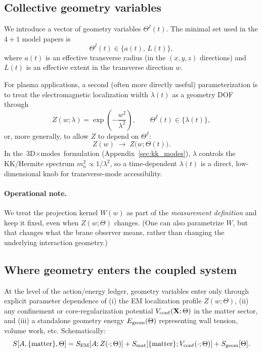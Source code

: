 \documentclass[11pt]{article}
\begin{document}
\subsection{Collective geometry variables}
\label{app:geom_vars}

We introduce a vector of geometry variables \(\Theta^I(t)\). The minimal set used in the
\(4+1\) model papers is
\begin{equation}
\Theta^I(t) \in \{a(t),\,L(t)\},
\end{equation}
where \(a(t)\) is an effective transverse radius (in the \((x,y,z)\) directions) and
\(L(t)\) is an effective extent in the transverse direction \(w\).

For plasma applications, a second (often more directly useful) parameterization is to
treat the electromagnetic localization width \(\lambda(t)\) as a geometry DOF through
\begin{equation}
Z(w;\lambda) = \exp\!\left(-\frac{w^2}{\lambda^2}\right),
\qquad \Theta^I(t)\in\{\lambda(t)\},
\end{equation}
or, more generally, to allow \(Z\) to depend on \(\Theta^I\):
\begin{equation}
Z(w) \;\longrightarrow\; Z\bigl(w;\Theta(t)\bigr).
\end{equation}
In the \(\text{3D}\times\text{modes}\) formulation (Appendix~\ref{sec:kk_modes}), \(\lambda\)
controls the KK/Hermite spectrum \(m_n^2\propto 1/\lambda^2\), so a time-dependent \(\lambda(t)\)
is a direct, low-dimensional knob for transverse-mode accessibility.

\paragraph{Operational note.}
We treat the projection kernel \(W(w)\) as part of the \emph{measurement definition} and keep it
fixed, even when \(Z(w;\Theta)\) changes. (One can also parametrize \(W\), but that changes what the
brane observer means, rather than changing the underlying interaction geometry.)

\subsection{Where geometry enters the coupled system}
\label{app:geom_enters_action}

At the level of the action/energy ledger, geometry variables enter only through explicit
parameter dependence of (i) the EM localization profile \(Z(w;\Theta)\), (ii) any confinement or
core-regularization potential \(V_{\rm conf}(\mathbf{X};\Theta)\) in the matter sector, and (iii)
a standalone geometry energy \(E_{\rm geom}(\Theta)\) representing wall tension, volume work, etc.
Schematically:
\begin{equation}
S[A,\{\text{matter}\},\Theta]
=
S_{\rm EM}[A;Z(\cdot;\Theta)]
+
S_{\rm mat}[\{\text{matter}\};V_{\rm conf}(\cdot;\Theta)]
+
S_{\rm geom}[\Theta].
\end{equation}
\end{document}
